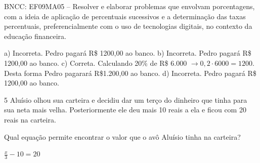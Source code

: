 \begin{escolha}
\begin{boxmedio}
\begin{boxmedio}
{\begin{boxpeq}
\begin{boxpeq}
{\begin{boxpeq}
\begin{boxmedio}
\begin{boxmedio}
\begin{boxpeq}
\begin{boxmedio}
\begin{boxpeq}
\begin{boxpeq}
\begin{boxpeq}
\begin{boxpeq}
\begin{boxmedio}
{\begin{boxmedio}
\begin{boxmedio}
\begin{boxpeq}
\begin{boxmedio}
\begin{boxpeq}
\begin{boxpeq}
\begin{boxpeq}
\begin{escolha}
{\begin{boxmedio}
\begin{boxpeq}
\begin{boxpeq}
\begin{boxpeq}
\begin{boxpeq}
\begin{boxpeq}
\begin{boxmedio}
\begin{boxpeq}
\begin{boxpeq}
\begin{boxpeq}
{\begin{boxpeq}
\begin{boxmedio}
\begin{boxpeq}
\begin{boxpeq}
\begin{boxpeq}
{\begin{boxpeq}
\begin{boxmedio}
{\begin{boxpeq}
\begin{boxpeq}
\begin{boxmedio}
\begin{boxmedio}
\begin{boxpeq}
\begin{boxpeq}
{\begin{boxpeq}
\begin{boxpeq}
\begin{boxpeq}
\begin{boxpeq}
\begin{boxpeq}
\begin{escolha}
\begin{escolha}
{\begin{boxmedio}
\begin{boxpeq}
\begin{q°}
\begin{boxmedio}
\begin{boxpeq}
\begin{boxpeq}
\begin{boxmedio}
\begin{boxmedio}
\begin{boxmedio}
\begin{boxmedio}
{\begin{enumerate}
\begin{boxpeq}
{\begin{boxpeq}
\begin{boxpeq}
\begin{boxmedio}
\begin{boxpeq}
\begin{boxpeq}
\begin{boxpeq}
{BNCC: EF09MA05 -- Resolver e elaborar problemas que envolvam porcentagens, 
com a ideia de aplicação de percentuais sucessivos e a determinação das taxas
percentuais, preferencialmente com o uso de tecnologias digitais, no
contexto da educação financeira. 

a) Incorreta. Pedro pagará R\$ 1200,00 ao banco.
b) Incorreta. Pedro pagará R\$ 1200,00 ao banco.
c) Correta. Calculando 20\% de R\$ 6.000 $\rightarrow 0,2 \cdot 6000 =
1200$. Desta forma Pedro pagarará R\$1.200,00 ao banco.
d) Incorreta. Pedro pagará R\$ 1200,00 ao banco.}

\num{5} Aluísio olhou sua carteira e decidiu dar um terço do dinheiro 
que tinha para sua neta mais velha. Posteriormente ele deu mais 10 reais 
a ela e ficou com 20 reais na carteira.

Qual equação permite encontrar o valor que o avô Aluísio tinha na 
carteira?

\begin{escolha}

\item $\frac{x}{3} - 10 = 20$ 


\end{escolha}
\end{boxpeq}
\end{boxpeq}
\end{boxpeq}
\end{boxmedio}
\end{boxpeq}
\end{boxpeq}}
\end{boxpeq}
\end{enumerate}}
\end{boxmedio}
\end{boxmedio}
\end{boxmedio}
\end{boxmedio}
\end{boxpeq}
\end{boxpeq}
\end{boxmedio}
\end{q°}
\end{boxpeq}
\end{boxmedio}}
\end{escolha}
\end{escolha}
\end{boxpeq}
\end{boxpeq}
\end{boxpeq}
\end{boxpeq}
\end{boxpeq}}
\end{boxpeq}
\end{boxpeq}
\end{boxmedio}
\end{boxmedio}
\end{boxpeq}
\end{boxpeq}}
\end{boxmedio}
\end{boxpeq}}
\end{boxpeq}
\end{boxpeq}
\end{boxpeq}
\end{boxmedio}
\end{boxpeq}}
\end{boxpeq}
\end{boxpeq}
\end{boxpeq}
\end{boxmedio}
\end{boxpeq}
\end{boxpeq}
\end{boxpeq}
\end{boxpeq}
\end{boxpeq}
\end{boxmedio}}
\end{escolha}
\end{boxpeq}
\end{boxpeq}
\end{boxpeq}
\end{boxmedio}
\end{boxpeq}
\end{boxmedio}
\end{boxmedio}}
\end{boxmedio}
\end{boxpeq}
\end{boxpeq}
\end{boxpeq}
\end{boxpeq}
\end{boxmedio}
\end{boxpeq}
\end{boxmedio}
\end{boxmedio}
\end{boxpeq}}
\end{boxpeq}
\end{boxpeq}}
\end{boxmedio}
\end{boxmedio}
\end{escolha}
